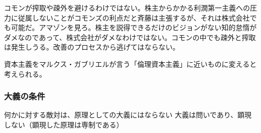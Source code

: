 コモンが搾取や疎外を避けるわけではない。株主からかかる利潤第一主義への圧力に従属しないことがコモンズの利点だと斉藤は主張するが、それは株式会社でも可能だ。アマゾンを見ろ。株主を説得できるだけのビジョンがない知的怠惰がダメなのであって、株式会社がダメなわけではない。コモンの中でも疎外と搾取は発生しうる。改善のプロセスから逃げてはならない。

資本主義をマルクス・ガブリエルが言う「倫理資本主義」に近いものに変えると考えられる。

\subsubsection{大義の条件}\label{ux5927ux7fa9ux306eux6761ux4ef6}

何かに対する敵対は、原理としての大義にはならない
大義は問いであり、顕現しない（顕現した原理は専制である）
